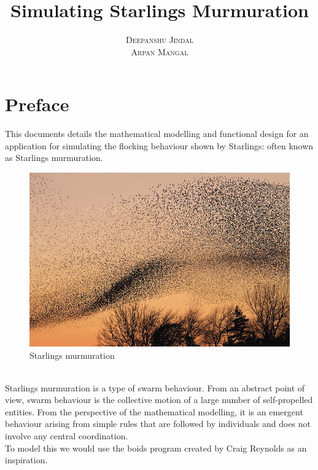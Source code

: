\documentclass[a4paper,11pt,openany]{book}
\title{\Huge \textbf{Simulating Starlings Murmuration}}\\
\author{\textsc{Deepanshu Jindal} \\ \textsc{Arpan Mangal}}
\begin{document}
\frontmatter
\maketitle

\tableofcontents
\listoffigures

\mainmatter

\chapter*{Preface}
This documents details the mathematical modelling and functional design for an application for simulating the flocking behaviour shown by Starlings: often known as Starlings murmuration.\\
\begin{figure}[h]
\centering
\includegraphics[scale=0.4]{Starling_murmuration.jpg}
\caption{Starlings murmuration}
\end{figure}
\\
Starlings murmuration is a type of swarm behaviour. From an abstract point of view, swarm behaviour is the collective motion of a large number of self-propelled entities. From the perspective of the mathematical modelling, it is an emergent behaviour arising from simple rules that are followed by individuals and does not involve any central coordination.\\

To model this we would use the boids program created by Craig Reynolds as an inspiration.
\\


\end{document}
